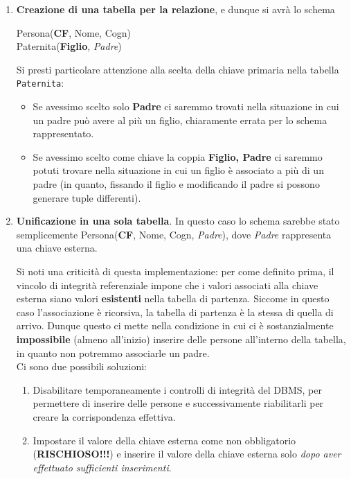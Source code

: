 \documentclass[12pt]{report}
\begin{document}
	\begin{enumerate}
		\item \textbf{Creazione di una tabella per la relazione}, e dunque si avrà lo schema
		\begin{center}
			Persona(\textbf{CF}, Nome, Cogn)\\
			Paternita(\textbf{Figlio}, \textit{Padre})
		\end{center}
		Si presti particolare attenzione alla scelta della chiave primaria nella tabella \texttt{Paternita}:
		\begin{itemize}
			\item Se avessimo scelto solo \textbf{Padre} ci saremmo trovati nella situazione in cui un padre può avere al più un figlio, chiaramente errata per lo schema rappresentato.
			
			\item Se avessimo scelto come chiave la coppia \textbf{Figlio, Padre} ci saremmo potuti trovare nella situazione in cui un figlio è associato a più di un padre (in quanto, fissando il figlio e modificando il padre si possono generare tuple differenti).
		\end{itemize}
		
		\item \textbf{Unificazione in una sola tabella}. In questo caso lo schema sarebbe stato semplicemente Persona(\textbf{CF}, Nome, Cogn, \textit{Padre}), dove \textit{Padre} rappresenta una chiave esterna.
		
		Si noti una criticità di questa implementazione: per come definito prima, il vincolo di integrità referenziale impone che i valori associati alla chiave esterna siano valori \textbf{esistenti} nella tabella di partenza. Siccome in questo caso l'associazione è ricorsiva, la tabella di partenza è la stessa di quella di arrivo. Dunque questo ci mette nella condizione in cui ci è sostanzialmente \textbf{impossibile} (almeno all'inizio) inserire delle persone all'interno della tabella, in quanto non potremmo associarle un padre.\\
		Ci sono due possibili soluzioni:
		\begin{enumerate}
			\item Disabilitare temporaneamente i controlli di integrità del DBMS, per permettere di inserire delle persone e successivamente riabilitarli per creare la corrispondenza effettiva.
			
			\item Impostare il valore della chiave esterna come non obbligatorio (\textbf{RISCHIOSO!!!}) e inserire il valore della chiave esterna solo \textit{dopo aver effettuato sufficienti inserimenti}.
		\end{enumerate}
	\end{enumerate}
	
\end{document}
